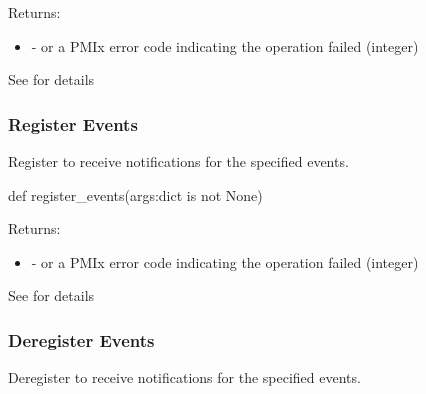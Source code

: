 Returns:
\begin{itemize}
    \item {} -  or a \ac{PMIx} error code indicating the operation failed (integer)
\end{itemize}

See  for details


\subsubsection{Register Events}

\summary

Register to receive notifications for the specified events.

\format

\pyspecificstart
\begin{codepar}
def register_events(args:dict is not None)
\end{codepar}
\pyspecificend

\begin{arglist}
\end{arglist}

Returns:
\begin{itemize}
    \item {} -  or a \ac{PMIx} error code indicating the operation failed (integer)
\end{itemize}

See  for details


\subsubsection{Deregister Events}

\summary

Deregister to receive notifications for the specified events.

\format

